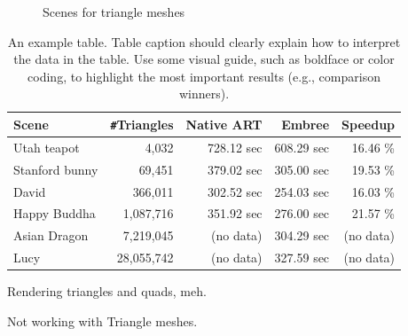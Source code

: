 \begin{figure}
	\hfill
	
	\caption{Scenes for triangle meshes}
	\label{fig:mesh_scenes}
\end{figure}

\begin{table}
	\centering
	{\footnotesize\sf
		\begin{tabular}{lrrrr}
			\toprule
			Scene & \Verb!#!Triangles & Native ART & Embree & Speedup \\ 
			\midrule
			Utah teapot & 4,032 & 728.12 sec & 608.29 sec & 16.46 \% \\
			Stanford bunny & 69,451 & 379.02 sec & 305.00 sec & 19.53 \% \\
			David & 366,011 & 302.52 sec & 254.03 sec & 16.03 \%  \\
			\addlinespace %
			Happy Buddha & 1,087,716 & 351.92 sec & 276.00 sec & 21.57 \% \\
			Asian Dragon & 7,219,045 & (no data) & 304.29 sec & (no data)  \\
			Lucy & 28,055,742 & (no data) & 327.59 sec & (no data)  \\
			\bottomrule
	\end{tabular}}
	\caption{An example table. Table caption should clearly explain how to interpret the data in the table. Use some visual guide, such as boldface or color coding, to highlight the most important results (e.g., comparison winners).}
	\label{tab:mesh}
\end{table}






Rendering triangles and quads, meh.

Not working with Triangle meshes.

